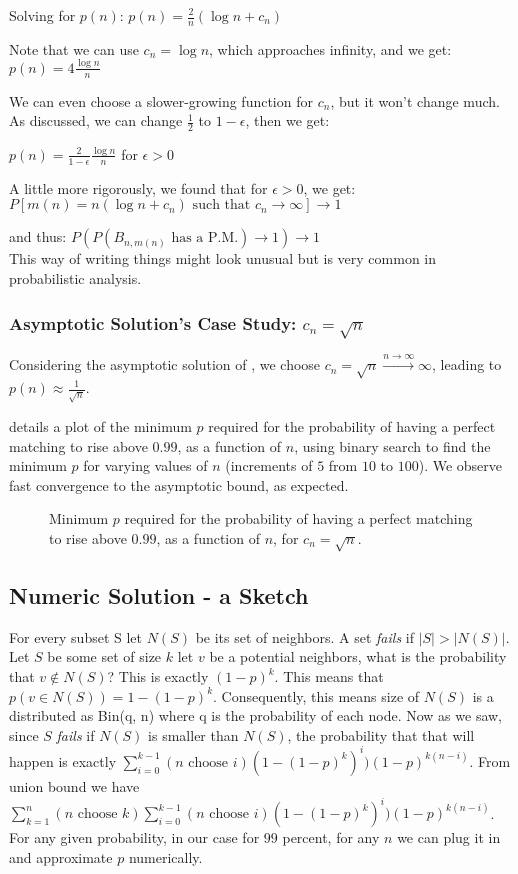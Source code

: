 \documentclass{article}
\begin{document}
Solving for $p(n)$: $p(n) = \frac{2}{n}(\log n + c_n)$

Note that we can use $c_n = \log n$, which approaches infinity, and we get: $p(n) = 4\frac{\log n}{n}$

We can even choose a slower-growing function for $c_n$, but it won't change much. As discussed, we can change $\frac{1}{2}$ to $1 - \epsilon$, then we get: 

$p(n) = \frac{2}{1-\epsilon}\frac{\log n}{n}$ for $\epsilon > 0$

A little more rigorously, we found that for $\epsilon > 0$, we get:
\\$P[m(n) = n(\log n + c_n) \text{ such that } c_n \to \infty] \to 1$

and thus: $P(P(B_{n, m(n)} \text{ has a P.M.}) \to 1) \to 1$
\\This way of writing things might look unusual but is very common in probabilistic analysis.

\subsubsection{Asymptotic Solution's Case Study: $c_n = \sqrt{n}$}

Considering the asymptotic solution of , we choose $c_n = \sqrt{n} \overset{n \to \infty}{\longrightarrow} \infty$, leading to $p(n) \approx \frac{1}{\sqrt{n}}$.

 details a plot of the minimum $p$ required for the probability of having a perfect matching to rise above $0.99$, as a function of $n$, using binary search to find the minimum $p$ for varying values of $n$ (increments of $5$ from $10$ to $100$). We observe fast convergence to the asymptotic bound, as expected.

\begin{figure*}[h]
    \centering
    \resizebox{0.6\textwidth}{!}{
        
    }
    \caption{Minimum $p$ required for the probability of having a perfect matching to rise above $0.99$, as a function of $n$, for $c_n = \sqrt{n}$.}
    \label{fig:bonus3}
\end{figure*}

\subsection{Numeric Solution - a Sketch}
For every subset S let $N(S)$ be its set of neighbors. A set \textit{fails} if $|S|>|N(S)|$. Let $S$ be some set of size $k$ let $v$ be a potential neighbors, what is the probability that $v\notin N(S)$? This is exactly $(1-p)^k$. This means that $p(v\in N(S))=1-(1-p)^k$. Consequently, this means size of $N(S)$ is a distributed as Bin(q, n) where q is the probability of each node. Now as we saw, since $S$ \textit{fails} if $N(S)$ is smaller than $N(S)$, the probability that that will happen is exactly $\sum_{i=0}^{k-1}(n \text{ choose } i) (1-(1-p)^k)^i)(1-p)^{k(n-i)}$.  From union bound we have $\sum_{k=1}^n(n\text{ choose } k)\sum_{i=0}^{k-1}(n \text{ choose } i) (1-(1-p)^k)^i)(1-p)^{k(n-i)}$. 
For any given probability, in our case for $99$ percent, for any $n$ we can plug it in and approximate $p$ numerically.


\end{document}
